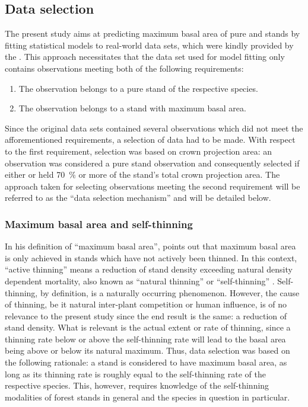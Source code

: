 \subsection{Data selection}
The present study aims at predicting maximum basal area of pure \Beech{} and \Spruce{} stands by fitting statistical models to real-world data sets, which were kindly provided by the \NWFVA{}.  This approach necessitates that the data set used for model fitting only contains observations meeting both of the following requirements:
\begin{enumerate}
\item The observation belongs to a pure stand of the respective species.
\item The observation belongs to a stand with maximum basal area.
\end{enumerate}
Since the original data sets contained several observations which did not meet the afforementioned requirements, a selection of data had to be made.  With respect to the first requirement, selection was based on crown projection area: an observation was considered a pure stand observation and consequently selected if either \Beech{} or \Spruce{} held \SI{70}{\percent} or more of the stand’s total crown projection area.
The approach taken for selecting observations meeting the second requirement will be referred to as the ``data selection mechanism'' and will be detailed below.

\subsubsection{Maximum basal area and self-thinning}

In his definition of ``maximum basal area'', \textcite{Assmann1970} points out that maximum basal area is only achieved in stands which have not actively been thinned.  In this context, ``active thinning'' means a reduction of stand density exceeding natural density dependent mortality, also known as ``natural thinning'' \parencite{SAF1958} or ``self-thinning'' \parencite{Roehrig1992}.  Self-thinning, by definition, is a naturally occurring phenomenon.  However, the cause of thinning, be it natural inter-plant competition or human influence, is of no relevance to the present study since the end result is the same: a reduction of stand density.  What is relevant is the actual extent or rate of thinning, since a thinning rate below or above the self-thinning rate will lead to the basal area being above or below its natural maximum.  Thus, data selection was based on the following rationale: a stand is considered to have maximum basal area, as long as its thinning rate is roughly equal to the self-thinning rate of the respective species.  This, however, requires knowledge of the self-thinning modalities of forest stands in general and the species in question in particular.

